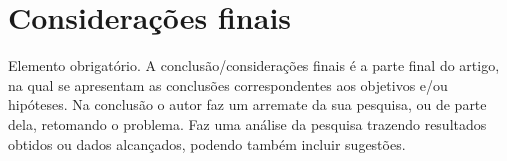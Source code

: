 \section{Considerações finais}

Elemento obrigatório. A conclusão/considerações finais é a parte final do artigo, na qual se apresentam as conclusões correspondentes aos objetivos e/ou hipóteses. Na conclusão o autor faz um arremate da sua pesquisa, ou de parte dela, retomando o problema. Faz uma análise da pesquisa trazendo resultados obtidos ou dados alcançados, podendo também incluir sugestões.